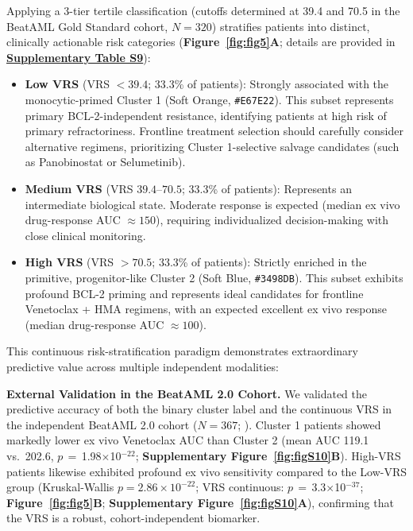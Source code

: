 \documentclass[11pt,a4paper]{article}
\newcommand{\pval}[1]{$p$\,$=$\,#1}
\begin{document}
Applying a 3-tier tertile classification (cutoffs determined at 39.4 and 70.5 in the BeatAML Gold Standard cohort, $N=320$) stratifies patients into distinct, clinically actionable risk categories (\textbf{Figure~\ref{fig:fig5}A}; details are provided in \href{Supplementary_Methods.pdf#tab:tabS9}{\textbf{Supplementary Table S9}}):
\begin{itemize}
\item \textbf{Low VRS} (VRS $< 39.4$; 33.3\% of patients): Strongly associated with the monocytic-primed Cluster 1 (Soft Orange, \texttt{\#E67E22}). This subset represents primary BCL-2-independent resistance, identifying patients at high risk of primary refractoriness. Frontline treatment selection should carefully consider alternative regimens, prioritizing Cluster 1-selective salvage candidates (such as Panobinostat or Selumetinib).
\item \textbf{Medium VRS} (VRS $39.4$--$70.5$; 33.3\% of patients): Represents an intermediate biological state. Moderate response is expected (median ex vivo drug-response AUC $\approx 150$), requiring individualized decision-making with close clinical monitoring.
\item \textbf{High VRS} (VRS $> 70.5$; 33.3\% of patients): Strictly enriched in the primitive, progenitor-like Cluster 2 (Soft Blue, \texttt{\#3498DB}). This subset exhibits profound BCL-2 priming and represents ideal candidates for frontline Venetoclax + HMA regimens, with an expected excellent ex vivo response (median drug-response AUC $\approx 100$).
\end{itemize}

This continuous risk-stratification paradigm demonstrates extraordinary predictive value across multiple independent modalities:

\textbf{External Validation in the BeatAML 2.0 Cohort.} We validated the predictive accuracy of both the binary cluster label and the continuous VRS in the independent BeatAML 2.0 cohort ($N=367$; \cite{bottomly2022}). Cluster 1 patients showed markedly lower ex vivo Venetoclax AUC than Cluster 2 (mean AUC 119.1 vs.\ 202.6, \pval{1.98$\times$10$^{-22}$}; \textbf{Supplementary Figure~\ref{fig:figS10}B}). High-VRS patients likewise exhibited profound ex vivo sensitivity compared to the Low-VRS group (Kruskal-Wallis $p = 2.86 \times 10^{-22}$; VRS continuous: \pval{3.3$\times$10$^{-37}$}; \textbf{Figure~\ref{fig:fig5}B}; \textbf{Supplementary Figure~\ref{fig:figS10}A}), confirming that the VRS is a robust, cohort-independent biomarker.
\end{document}
